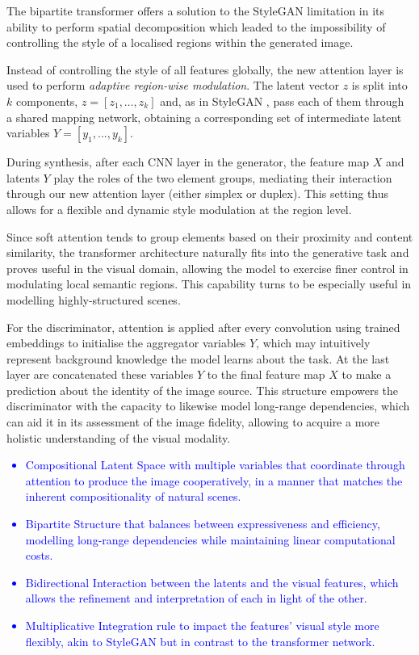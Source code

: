 \documentclass{article}
\begin{document}
	The bipartite transformer offers a solution to the StyleGAN limitation in its ability to perform spatial 
	decomposition which leaded to the impossibility of controlling the style of a localised regions within 
	the generated image.
	
	Instead of controlling the style of all features globally, the new attention layer is used to perform 
	\textit{adaptive region-wise modulation}. The latent vector $z$ is split into $k$ components, $z = 
	[z_1 , \dots, z_k ]$ and, as in StyleGAN \cite{karras2019style}, pass each of them through a shared 
	mapping network, obtaining a corresponding set of intermediate latent variables $Y = [y_1 , ..., y_k 
	]$. 
	
	During synthesis, after each CNN layer in the generator, the feature map $X$ and latents $Y$ play 
	the roles of the two element groups, mediating their interaction through our new attention layer 
	(either simplex or duplex). 
	This setting thus allows for a flexible and dynamic style modulation at the region level. 
	
	Since soft attention tends to group elements based on their proximity and content similarity, the 
	transformer architecture naturally fits into the generative task and proves useful in the visual 
	domain, allowing the model to exercise finer control in modulating local semantic regions. This 
	capability turns to be especially useful in modelling highly-structured scenes.
	
	For the discriminator, attention is applied after every convolution using trained embeddings to 
	initialise the aggregator variables $Y$, which may intuitively represent background knowledge the 
	model learns about the task. At the last layer are concatenated these variables $Y$ to the final 
	feature map $X$ to make a prediction about the identity of the image source. 
	This structure empowers the discriminator with the capacity to likewise model long-range 
	dependencies, which can aid it in its assessment of the image fidelity, allowing to acquire a more 
	holistic understanding of the visual modality.
	\textcolor{blue}{
	\begin{itemize}
		\item Compositional Latent Space with multiple variables that coordinate through attention to 
		produce the image cooperatively, in a manner that matches the inherent compositionality of 
		natural scenes.
		\item Bipartite Structure that balances between expressiveness and efficiency, modelling 
		long-range dependencies while maintaining linear computational costs.
		\item Bidirectional Interaction between the latents and the visual features, which allows the 
		refinement and interpretation of each in light of the other.
		\item Multiplicative Integration rule to impact the features' visual style more flexibly, akin to 
		StyleGAN but in contrast to the transformer network.
	\end{itemize}
}
	
\end{document}
